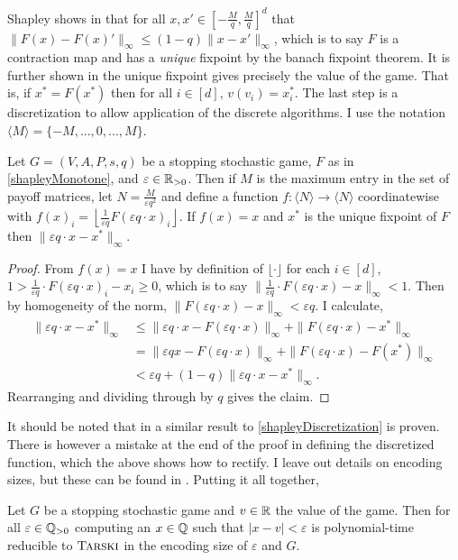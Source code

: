 Shapley shows in \citep{shapley} that for all $x, x' \in [-\frac{M}{q}, \frac{M}{q}]^d$ 
that $\|F(x) - F(x)'\|_\infty \leq (1 - q) \|x - x'\|_\infty$,
which is to say $F$ is a contraction map and has a \emph{unique} fixpoint by the banach fixpoint theorem. 
It is further shown in \citep{shapley} the unique fixpoint gives precisely the value of the game. That is, 
if $x^* = F(x^*)$ then
for all $i \in [d]$, $v(v_i) = x^*_i$. The last step is a discretization to allow application
of the discrete algorithms. I
use the notation $\langle M \rangle = \{-M, ..., 0, ..., M\}$. 
\newcommand{\angm}{\langle M \rangle}
\begin{lemma} \label{shapleyDiscretization}
  Let $G = (V, A, P, s, q)$ be a stopping stochastic game, $F$ as in \cref{shapleyMonotone}, 
  and $\varepsilon \in \mathbb{R}_{> 0}$. Then if $M$ is the maximum entry in the set of payoff matrices, let 
  $N = \frac{M}{\varepsilon q^2}$ and define a function $f : \langle N \rangle \to \langle N \rangle$ coordinatewise with
  $f(x)_i = \left\lfloor \frac{1}{\varepsilon q} F(\varepsilon q \cdot x)_i \right\rfloor$. If $f(x) = x$
  and $x^*$ is the unique fixpoint of $F$ then $\|\varepsilon q \cdot x - x^*\|_\infty$.
\end{lemma}
\begin{proof}
  From $f(x) = x$ I have by definition of $\lfloor \cdot \rfloor$ for each $i \in [d]$,
  $1 > \frac{1}{\varepsilon q} \cdot F(\varepsilon q \cdot x)_i - x_i \geq 0$, which is to say
  $\|\frac{1}{\varepsilon q} \cdot F(\varepsilon q \cdot x) - x\|_\infty < 1$. Then by homogeneity of the norm,
  $\|F(\varepsilon q \cdot x) - x\|_\infty < \varepsilon q$. I calculate,
  \begin{align*}
    \|\varepsilon q \cdot x - x^* \|_\infty &\leq \|\varepsilon q \cdot x - F(\varepsilon q \cdot x) \|_\infty
                                           + \| F(\varepsilon q \cdot x) - x^* \|_\infty \\
                                      &=  \|\varepsilon q x - F(\varepsilon q \cdot x) \|_\infty
                                        +  \| F(\varepsilon q \cdot x) - F(x^*) \|_\infty \\
                                      &< \varepsilon q + (1 - q)\| \varepsilon q \cdot x - x^* \|_\infty.
  \end{align*}
  Rearranging and dividing through by $q$ gives the claim.
\end{proof}
It should be noted that in \citep[Proposition 6.2.]{lowerBound} a similar result to \cref{shapleyDiscretization} 
is proven. There is however a mistake at the end of the proof in defining the discretized function, which the above
shows how to rectify.
I leave out details on encoding sizes, but these can be found in \citep{lowerBound}.
Putting it all together,
\begin{theorem}
  Let $G$ be a stopping stochastic game and $v \in \mathbb{R}$ the value of the game. Then for all $\varepsilon \in \mathbb{Q}_{> 0}$
  computing 
  an $x \in \mathbb{Q}$ such that $|x - v| < \varepsilon$ is polynomial-time reducible to $\textsc{Tarski}$ in the encoding size
  of $\varepsilon$ and $G$.
\end{theorem}
